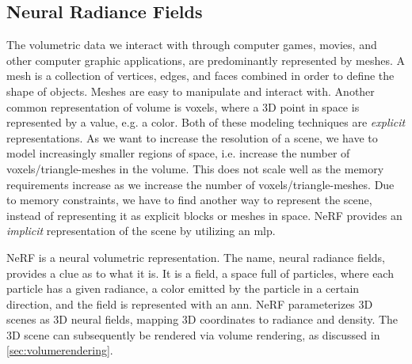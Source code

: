 



\subsection{Neural Radiance Fields}
The volumetric data we interact with through computer games, movies, and other computer graphic applications, are predominantly represented by meshes. A mesh is a collection of vertices, edges, and faces combined in order to define the shape of objects. Meshes are easy to manipulate and interact with. Another common representation of volume is voxels, where a 3D point in space is represented by a value, e.g. a color. Both of these modeling techniques are \textit{explicit} representations. As we want to increase the resolution of a scene, we have to model increasingly smaller regions of space, i.e. increase the number of voxels/triangle-meshes in the volume. This does not scale well as the memory requirements increase as we increase the number of voxels/triangle-meshes. Due to memory constraints, we have to find another way to represent the scene, instead of representing it as explicit blocks or meshes in space. NeRF provides an \textit{implicit} representation of the scene by utilizing an \acrshort{mlp}.

NeRF is a neural volumetric representation. The name, neural radiance fields, provides a clue as to what it is. It is a field, a space full of particles, where each particle has a given radiance, a color emitted by the particle in a certain direction, and the field is represented with an \acrshort{ann}. NeRF parameterizes 3D scenes as 3D neural fields, mapping 3D coordinates to radiance and density. The 3D scene can subsequently be rendered via volume rendering, as discussed in \autoref{sec:volumerendering}.


